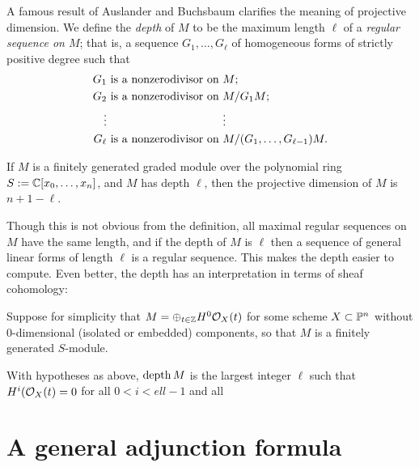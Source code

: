 {

A famous result of Auslander and Buchsbaum clarifies the meaning of projective dimension. We define the 
\emph{depth} of $M$ to be the maximum length $\ell$ of a \emph{regular sequence on $M$}; that is, a sequence $G_{1},\dots,G_{\ell}$ of homogeneous forms of strictly positive degree such that 
\begin{align*}
G_{1} &\hbox{ is a nonzerodivisor on } M;\\
G_{2} &\hbox{ is a nonzerodivisor on } M/G_{1}M;\\
\vdots&\phantom{\hbox{ is a nonzerodivisor on } }\vdots\\
G_{\ell} &\hbox{ is a nonzerodivisor on } M/(G_{1},\dots,G_{\ell-1})M.
\end{align*}

\begin{theorem}
If $M$ is a finitely generated graded module over the polynomial ring $S := \CC[x_{0},\dots,x_{n}]$, and $M$ has depth $\ell$, then the projective dimension of $M$ is $n+1-\ell$.
\end{theorem}

Though this is not obvious from the definition, all maximal regular sequences on $M$ have the same length, and if the depth of $M$ is $\ell$ then a sequence of general linear forms of length $\ell$ is a regular sequence. This makes the depth easier to compute. Even better, the depth has an interpretation in terms of sheaf cohomology:

Suppose for simplicity that $M = \oplus_{t\in \ZZ}H^{0}\cO_{X}(t)$ for some scheme $X\subset \PP^{n}$ without 0-dimensional (isolated or embedded) components, so that $M$ is a finitely generated $S$-module. 
\begin{theorem}
 With hypotheses as above, $\depth M$ is the largest integer $\ell$ such that $H^{i}(\cO_{X}(t) = 0$ for all $0<i<ell-1$ and all 
\end{theorem}


\section {A general adjunction formula} 


}
